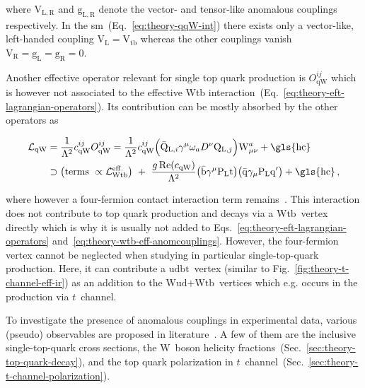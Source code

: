 where $\mathrm{V}_\mathrm{L,R}$ and $\mathrm{g}_\mathrm{L,R}$ denote the vector- and tensor-like anomalous couplings respectively. In the \gls{sm}~(Eq.~\ref{eq:theory-qqW-int}) there exists only a vector-like, left-handed coupling $\mathrm{V}_\mathrm{L}=\mathrm{V}_\mathrm{tb}$ whereas the other couplings vanish $\mathrm{V}_\mathrm{R}=\mathrm{g}_\mathrm{L}=\mathrm{g}_\mathrm{R}=0$.

Another effective operator relevant for single top quark production is $O_\mathrm{qW}^{ij}$ which is however not associated to the effective Wtb interaction~(Eq.~\ref{eq:theory-eft-lagrangian-operators}). Its contribution can be mostly absorbed by the other operators as

\begin{align}
\mathcal{L}_\mathrm{qW}&=\frac{1}{\Lambda^2}c^{ij}_\mathrm{qW}O_\mathrm{qW}^{ij}=\frac{1}{\Lambda^2}c^{ij}_\mathrm{qW}\Big(\bar{\mathrm{Q}}_{\mathrm{L},i}\gamma^{\mu}\omega_{a}D^\nu\mathrm{Q}_{\mathrm{L},j}\Big)\mathrm{W}_{\mu\nu}^{a}+\mathrm{\gls{hc}}\nonumber\\
&\supset\big(\text{terms }\propto\mathcal{L}_\mathrm{Wtb}^\mathrm{eff.}\big)~+~\frac{g\,\mathrm{Re}(c_\mathrm{qW})}{\Lambda^2}\big(\bar{\mathrm{b}}\gamma^{\mu}\mathrm{P}_\mathrm{L}\mathrm{t}\big)\big(\bar{\mathrm{q}}\gamma_\mu\mathrm{P}_\mathrm{L}\mathrm{q}^\prime\big)+\mathrm{\gls{hc}}\,,\label{eq:theory-4q-eff-anomcouplings}
\end{align}

where however a four-fermion contact interaction term remains~\cite{Bach:2012fb}. This interaction does not contribute to top quark production and decays via a $\mathrm{Wtb}$~vertex directly which is why it is usually not added to Eqs.~\ref{eq:theory-eft-lagrangian-operators} and~\ref{eq:theory-wtb-eff-anomcouplings}. However, the four-fermion vertex cannot be neglected when studying in particular single-top-quark production. Here, it can contribute a $\mathrm{udbt}$~vertex (similar to Fig.~\ref{fig:theory-t-channel-eff-ir}) as an addition to the $\mathrm{Wud}\text{+}\mathrm{Wtb}$~vertices which e.g. occurs in the production via $t$~channel.

To investigate the presence of anomalous couplings in experimental data, various (pseudo) observables are proposed in literature~\cite{AguilarSaavedra:2010nx,Aguilar-Saavedra:2014eqa,Bernreuther:2015yna}. A few of them are the inclusive single-top-quark cross sections, the W~boson helicity fractions~(Sec.~\ref{sec:theory-top-quark-decay}), and the top quark polarization in $t$~channel~(Sec.~\ref{sec:theory-t-channel-polarization}).


